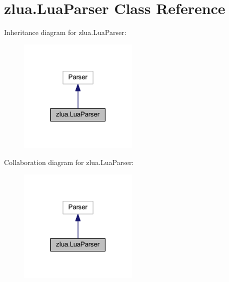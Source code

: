 \hypertarget{classzlua_1_1_lua_parser}{}\section{zlua.\+Lua\+Parser Class Reference}
\label{classzlua_1_1_lua_parser}


Inheritance diagram for zlua.\+Lua\+Parser\+:
\nopagebreak
\begin{figure}[H]
\begin{center}
\leavevmode
\includegraphics[width=162pt]{classzlua_1_1_lua_parser__inherit__graph}
\end{center}
\end{figure}


Collaboration diagram for zlua.\+Lua\+Parser\+:
\nopagebreak
\begin{figure}[H]
\begin{center}
\leavevmode
\includegraphics[width=162pt]{classzlua_1_1_lua_parser__coll__graph}
\end{center}
\end{figure}
